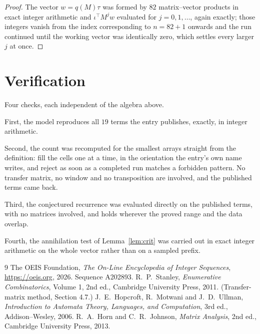 \documentclass[11pt,a4paper]{article}
\theoremstyle{plain}
\theoremstyle{definition}
\begin{document}
\begin{proof}
The vector $w=q(M)\tau$ was formed by $82$ matrix--vector products in exact integer
arithmetic and $\iota^{\!\top}M^{j}w$ evaluated for $j=0,1,\dots$, again exactly; those
integers vanish from the index corresponding to $n=82+1$ onwards and the run continued
until the working vector was identically zero, which settles every larger $j$ at once.
\end{proof}

\section{Verification}

Four checks, each independent of the algebra above.

First, the model reproduces all $19$ terms the entry publishes, exactly, in integer
arithmetic.

Second, the count was recomputed for the smallest arrays straight from the definition: fill the
cells one at a time, in the orientation the entry's own name writes, and reject as soon as a
completed run matches a forbidden pattern. No transfer matrix, no window and no transposition
are involved, and the published terms came back.

Third, the conjectured recurrence was evaluated directly on the published terms, with no
matrices involved, and holds wherever the proved range and the data overlap.

Fourth, the annihilation test of Lemma~\ref{lem:crit} was carried out in exact integer
arithmetic on the whole vector rather than on a sampled prefix.

\begin{thebibliography}{9}
 The OEIS Foundation, \emph{The On-Line Encyclopedia of Integer
Sequences}, \url{https://oeis.org}, 2026. Sequence A202893.
 R.~P.~Stanley, \emph{Enumerative Combinatorics}, Volume 1, 2nd ed.,
Cambridge University Press, 2011. (Transfer-matrix method, Section 4.7.)
 J.~E.~Hopcroft, R.~Motwani and J.~D.~Ullman, \emph{Introduction to Automata
Theory, Languages, and Computation}, 3rd ed., Addison--Wesley, 2006.
 R.~A.~Horn and C.~R.~Johnson, \emph{Matrix Analysis}, 2nd ed., Cambridge
University Press, 2013.
\end{thebibliography}
\end{document}

